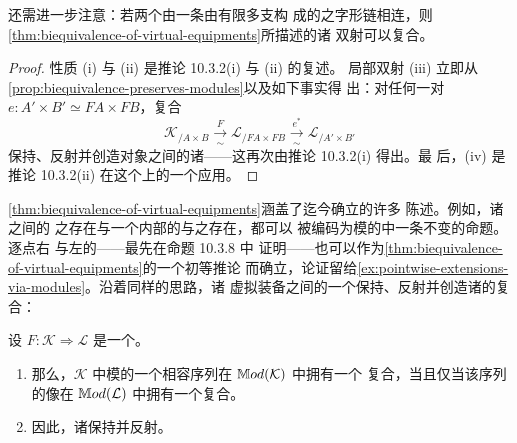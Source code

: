 还需进一步注意：若两个\trInfinityCosmos{}由一条由有限多支\trBiequivalence{}构
成的之字形链相连，则\cref{thm:biequivalence-of-virtual-equipments}所描述的诸
双射可以复合。

\begin{proof}
性质 (i) 与 (ii) 是推论 10.3.2(i) 与 (ii) 的复述。
局部双射 (iii) 立即从\cref{prop:biequivalence-preserves-modules}以及如下事实得
出：对任何一对\trEquivalence{}
$e\colon A'\times B'\simeq FA\times FB$，复合\trBiequivalence
\begin{equation*}
\mathcal{K}_{/A\times B}
\xrightarrow[\ \sim\ ]{\ F\ }
\mathcal{L}_{/FA\times FB}
\xrightarrow[\ \sim\ ]{\ e^{*}\ }
\mathcal{L}_{/A'\times B'}
\end{equation*}
保持、反射并创造对象之间的诸\trEquivalence——这再次由推论 10.3.2(i) 得出。最
后，(iv) 是推论 10.3.2(ii) 在这个\trCosmologicalBiequivalence{}上的一个应用。
\end{proof}

\cref{thm:biequivalence-of-virtual-equipments}涵盖了迄今确立的许多%
\trModelIndependence{}陈述。例如，诸\trInfinityCategory{}之间的\trAdjunction{}%
之存在与一个\trInfinityCategory{}内部的\trLimit{}与\trColimit{}之存在，都可以
被编码为模的\trVirtualEquipment{}中一条\trEquivalence{}不变的命题。逐点右%
\trExtension{}与左\trExtension{}的\trModelIndependence——最先在命题 10.3.8 中
证明——也可以作为\cref{thm:biequivalence-of-virtual-equipments}的一个初等推论
而确立，论证留给\cref{ex:pointwise-extensions-via-modules}。沿着同样的思路，诸
虚拟装备之间的一个\trBiequivalence{}保持、反射并创造诸\trModule{}的复合：

\begin{lemma}\label{lem:biequivalence-and-composites}
设 $F\colon\mathcal{K}\Rightarrow\mathcal{L}$ 是一个\trCosmologicalBiequivalence。
\begin{enumerate}[label=(\roman*)]
\item 那么，$\mathcal{K}$ 中模的一个相容序列在 $\mathbb{M}od(\mathcal{K})$ 中拥有一个
复合，当且仅当该序列的像在 $\mathbb{M}od(\mathcal{L})$ 中拥有一个复合。
\item 因此，诸\trCosmologicalBiequivalence{}保持并反射\trExactSquare。
\end{enumerate}
\end{lemma}

